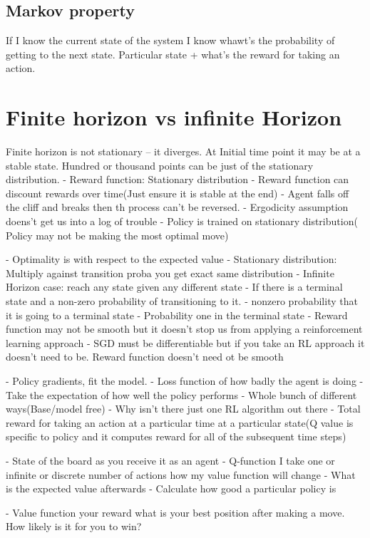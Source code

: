 \documentclass{article}
\begin{document}
\subsection{Markov property}
If I know the current state of the system I know whawt's the probability of getting to the next state. Particular state + what's the reward for taking an action.

\section{Finite horizon vs infinite Horizon}
Finite horizon is not stationary -- it diverges.
At Initial time point it may be at a stable state. Hundred or thousand points can be just of the stationary distribution.
- Reward function: Stationary distribution
- Reward function can discount rewards over time(Just ensure it is stable at the end)
- Agent falls off the cliff and breaks then th process can't be reversed.
- Ergodicity assumption doens't get us into a log of trouble
- Policy is trained on stationary distribution( Policy may not be making the most optimal move)

- Optimality is with respect to the expected value
- Stationary distribution: Multiply against transition proba you get exact same distribution
- Infinite Horizon case: reach any state given any different state
- If there is a terminal state and a non-zero probability of transitioning to it.
- nonzero probability that it is going to a terminal state
- Probability one in the terminal state
- Reward function may not be smooth but it doesn't stop us from applying a reinforcement learning approach
- SGD must be differentiable but if you take an RL approach it doesn't need to be. Reward function doesn't need ot be smooth

- Policy gradients, fit the model.
- Loss function of how badly the agent is doing
- Take the expectation of how well the policy performs
- Whole bunch of different ways(Base/model free)
- Why isn't there just one RL algorithm out there
- Total reward for taking an action at a particular time at a particular state(Q value is specific to policy and it computes reward for all of the subsequent time steps)


- State of the board as you receive it as an agent
- Q-function I take one or infinite or discrete number of actions how my value function will change
- What is the expected value afterwards
- Calculate how good a particular policy is


- Value function your reward what is your best position after making a move. How likely is it for you to win? 
\end{document}

